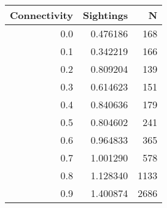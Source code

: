 \begin{tabular}{rrr}
\toprule
 Connectivity &  Sightings &    N \\
\midrule
          0.0 &   0.476186 &  168 \\
          0.1 &   0.342219 &  166 \\
          0.2 &   0.809204 &  139 \\
          0.3 &   0.614623 &  151 \\
          0.4 &   0.840636 &  179 \\
          0.5 &   0.804602 &  241 \\
          0.6 &   0.964833 &  365 \\
          0.7 &   1.001290 &  578 \\
          0.8 &   1.128340 & 1133 \\
          0.9 &   1.400874 & 2686 \\
\bottomrule
\end{tabular}
